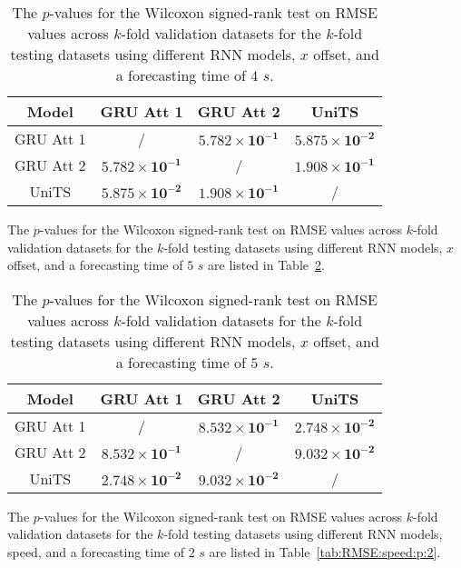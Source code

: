 \begin{table}[!ht]
	\centering
	\begin{tabular}{|c|c|c|c|}
		\hline
		Model & GRU Att 1 & GRU Att 2 & UniTS \\ \hline
		GRU Att 1 & / & $\mathbf{5.782 \times 10^{-1}}$ & $\mathbf{5.875 \times 10^{-2}}$ \\ \hline
		GRU Att 2 & $\mathbf{5.782 \times 10^{-1}}$ & / & $\mathbf{1.908 \times 10^{-1}}$ \\ \hline
		UniTS & $\mathbf{5.875 \times 10^{-2}}$ & $\mathbf{1.908 \times 10^{-1}}$ & / \\ \hline
	\end{tabular}
	\caption{The $p$-values for the Wilcoxon signed-rank test on RMSE values across $k$-fold validation datasets for the $k$-fold testing datasets using different RNN models, $x$ offset, and a forecasting time of $4$ $s$.}
	\label{tab:RMSE:longitude:no:abs:p:4}
\end{table}

The $p$-values for the Wilcoxon signed-rank test on RMSE values across $k$-fold validation datasets for the $k$-fold testing datasets using different RNN models, $x$ offset, and a forecasting time of $5$ $s$ are listed in Table~\ref{tab:RMSE:longitude:no:abs:p:5}.

\begin{table}[!ht]
	\centering
	\begin{tabular}{|c|c|c|c|}
		\hline
		Model & GRU Att 1 & GRU Att 2 & UniTS \\ \hline
		GRU Att 1 & / & $\mathbf{8.532 \times 10^{-1}}$ & $\mathbf{2.748 \times 10^{-2}}$ \\ \hline
		GRU Att 2 & $\mathbf{8.532 \times 10^{-1}}$ & / & $\mathbf{9.032 \times 10^{-2}}$ \\ \hline
		UniTS & $\mathbf{2.748 \times 10^{-2}}$ & $\mathbf{9.032 \times 10^{-2}}$ & / \\ \hline
	\end{tabular}
	\caption{The $p$-values for the Wilcoxon signed-rank test on RMSE values across $k$-fold validation datasets for the $k$-fold testing datasets using different RNN models, $x$ offset, and a forecasting time of $5$ $s$.}
	\label{tab:RMSE:longitude:no:abs:p:5}
\end{table}

The $p$-values for the Wilcoxon signed-rank test on RMSE values across $k$-fold validation datasets for the $k$-fold testing datasets using different RNN models, speed, and a forecasting time of $2$ $s$ are listed in Table~\ref{tab:RMSE:speed:p:2}.

